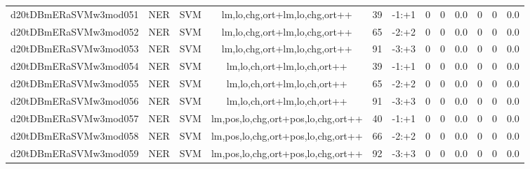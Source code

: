 \documentclass[a4paper]{article}
\begin{document}
\begin{landscape}
\begin{center}
\begin{tabular}{ |c|c|c|c|c|c|c|c|c|c|c|c|}
 
 	
 	\small{ d20tDBmERaSVMw3mod051 } & \small{ NER} & \small{  SVM }  & lm,lo,chg,ort+lm,lo,chg,ort++  &  39 &  \small{  -1:+1 }  &  0 & 0 & 0.0  &  0 & 0 & 0.0 \\
 	

 
 	
 	\small{ d20tDBmERaSVMw3mod052 } & \small{ NER} & \small{  SVM }  & lm,lo,chg,ort+lm,lo,chg,ort++  &  65 &  \small{  -2:+2 }  &  0 & 0 & 0.0  &  0 & 0 & 0.0 \\
 	

 
 	
 	\small{ d20tDBmERaSVMw3mod053 } & \small{ NER} & \small{  SVM }  & lm,lo,chg,ort+lm,lo,chg,ort++  &  91 &  \small{  -3:+3 }  &  0 & 0 & 0.0  &  0 & 0 & 0.0 \\
 	

 
 	
 	\small{ d20tDBmERaSVMw3mod054 } & \small{ NER} & \small{  SVM }  & lm,lo,ch,ort+lm,lo,ch,ort++  &  39 &  \small{  -1:+1 }  &  0 & 0 & 0.0  &  0 & 0 & 0.0 \\
 	

 
 	
 	\small{ d20tDBmERaSVMw3mod055 } & \small{ NER} & \small{  SVM }  & lm,lo,ch,ort+lm,lo,ch,ort++  &  65 &  \small{  -2:+2 }  &  0 & 0 & 0.0  &  0 & 0 & 0.0 \\
 	

 
 	
 	\small{ d20tDBmERaSVMw3mod056 } & \small{ NER} & \small{  SVM }  & lm,lo,ch,ort+lm,lo,ch,ort++  &  91 &  \small{  -3:+3 }  &  0 & 0 & 0.0  &  0 & 0 & 0.0 \\
 	

 
 	
 	\small{ d20tDBmERaSVMw3mod057 } & \small{ NER} & \small{  SVM }  & lm,pos,lo,chg,ort+pos,lo,chg,ort++  &  40 &  \small{  -1:+1 }  &  0 & 0 & 0.0  &  0 & 0 & 0.0 \\
 	

 
 	
 	\small{ d20tDBmERaSVMw3mod058 } & \small{ NER} & \small{  SVM }  & lm,pos,lo,chg,ort+pos,lo,chg,ort++  &  66 &  \small{  -2:+2 }  &  0 & 0 & 0.0  &  0 & 0 & 0.0 \\
 	

 
 	
 	\small{ d20tDBmERaSVMw3mod059 } & \small{ NER} & \small{  SVM }  & lm,pos,lo,chg,ort+pos,lo,chg,ort++  &  92 &  \small{  -3:+3 }  &  0 & 0 & 0.0  &  0 & 0 & 0.0 \\
 	


\end{tabular}
\end{center}
\end{landscape}
\end{document}
